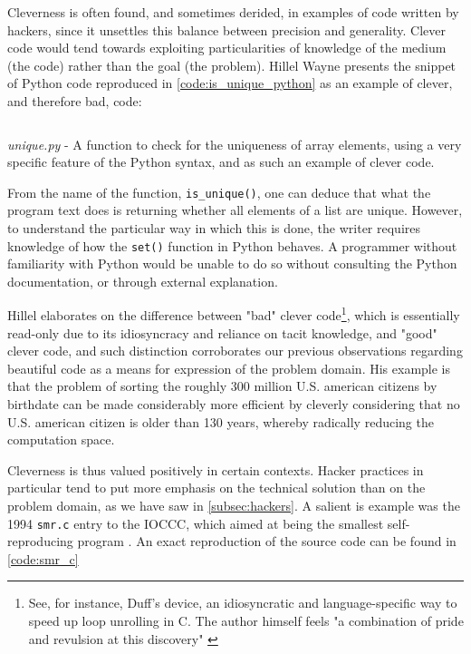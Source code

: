 Cleverness is often found, and sometimes derided, in examples of code written by hackers, since it unsettles this balance between precision and generality. Clever code would tend towards exploiting particularities of knowledge of the medium (the code) rather than the goal (the problem). Hillel Wayne presents the snippet of Python code reproduced in \autoref{code:is_unique_python} as an example of clever, and therefore bad, code:

\begin{listing}
  \inputminted{python}{./corpus/unique.py}
  \caption{\emph{unique.py} - A function to check for the uniqueness of array elements, using a very specific feature of the Python syntax, and as such an example of clever code.}
  \label{code:is_unique_python}
\end{listing}

From the name of the function, \lstinline{is_unique()}, one can deduce that what the program text does is returning whether all elements of a list are unique. However, to understand the particular way in which this is done, the writer requires knowledge of how the \lstinline{set()} function in Python behaves. A programmer without familiarity with Python would be unable to do so without consulting the Python documentation, or through external explanation.

Hillel elaborates on the difference between "bad" clever code\footnote{See, for instance, Duff's device, an idiosyncratic and language-specific way to speed up loop unrolling in C. The author himself feels "a combination of pride and revulsion at this discovery" \citep{duff_tom_1983}}, which is essentially read-only due to its idiosyncracy and reliance on tacit knowledge, and "good" clever code, and such distinction corroborates our previous observations regarding beautiful code as a means for expression of the problem domain. His example is that the problem of sorting the roughly 300 million U.S. american citizens by birthdate can be made considerably more efficient by cleverly considering that no U.S. american citizen is older than 130 years, whereby radically reducing the computation space.

Cleverness is thus valued positively in certain contexts. Hacker practices in particular tend to put more emphasis on the technical solution than on the problem domain, as we have saw in \autoref{subsec:hackers}. A salient is example was the 1994 \lstinline{smr.c} entry to the IOCCC, which aimed at being the smallest self-reproducing program \citep{kanakarakis_international_2022}. An exact reproduction of the source code can be found in \autoref{code:smr_c}

